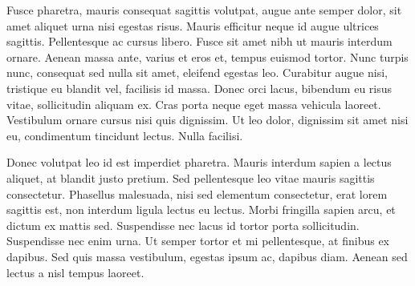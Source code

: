 \documentclass[10pt,a4paper]{article}
\begin{document}
\pagestyle{fancy}
\rfoot{\thepage}
\cfoot{}


\lstset{language=C,
        basicstyle=\small\ttfamily, keywordstyle=\bfseries,
        identifierstyle=\sffamily, stringstyle=\itshape,
    commentstyle=\itshape, showstringspaces=true,escapeinside=`'}

\questsection
 Fusce pharetra, mauris consequat sagittis volutpat, augue ante semper dolor, sit amet aliquet urna nisi egestas risus. Mauris efficitur neque id augue ultrices sagittis. Pellentesque ac cursus libero. Fusce sit amet nibh ut mauris interdum ornare. Aenean massa ante, varius et eros et, tempus euismod tortor. Nunc turpis nunc, consequat sed nulla sit amet, eleifend egestas leo. Curabitur augue nisi, tristique eu blandit vel, facilisis id massa. Donec orci lacus, bibendum eu risus vitae, sollicitudin aliquam ex. Cras porta neque eget massa vehicula laoreet. Vestibulum ornare cursus nisi quis dignissim. Ut leo dolor, dignissim sit amet nisi eu, condimentum tincidunt lectus. Nulla facilisi.\\


\questsection
Donec volutpat leo id est imperdiet pharetra. Mauris interdum sapien a lectus aliquet, at blandit justo pretium. Sed pellentesque leo vitae mauris sagittis consectetur. Phasellus malesuada, nisi sed elementum consectetur, erat lorem sagittis est, non interdum ligula lectus eu lectus. Morbi fringilla sapien arcu, et dictum ex mattis sed. Suspendisse nec lacus id tortor porta sollicitudin. Suspendisse nec enim urna. Ut semper tortor et mi pellentesque, at finibus ex dapibus. Sed quis massa vestibulum, egestas ipsum ac, dapibus diam. Aenean sed lectus a nisl tempus laoreet. \\

\end{document}
